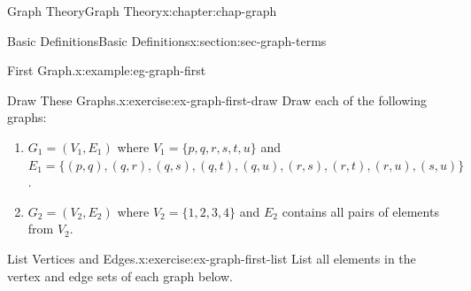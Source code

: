 \documentclass[oneside,10pt,]{book}
\numberwithin{equation}{section}
\begin{document}
\begin{chapterptx}{Graph Theory}{}{Graph Theory}{}{}{x:chapter:chap-graph}
\begin{sectionptx}{Basic Definitions}{}{Basic Definitions}{}{}{x:section:sec-graph-terms}
\begin{example}{First Graph.}{x:example:eg-graph-first}
\begin{sidebyside}{1}{0.375}{0.375}{0}
\begin{sbspanel}{0.25}
{
}%
\end{sbspanel}%
\end{sidebyside}%
\end{example}
\begin{inlineexercise}{Draw These Graphs.}{x:exercise:ex-graph-first-draw}%
Draw each of the following graphs:%
\begin{enumerate}[label=(\alph*)]
\item{}\(G_1 = (V_1, E_1)\) where \(V_1 = \{p, q, r, s, t, u\}\) and \(E_1 = \{(p,q),(q,r),(q,s),(q,t),(q,u),(r,s),(r,t),(r,u),(s,u)\}\).%
\item{}\(G_2 = (V_2, E_2)\) where \(V_2 = \{1,2,3,4\}\) and \(E_2\) contains all pairs of elements from \(V_2\).%
\end{enumerate}
%
\end{inlineexercise}%
\begin{inlineexercise}{List Vertices and Edges.}{x:exercise:ex-graph-first-list}%
List all elements in the vertex and edge sets of each graph below.%
\begin{sidebyside}{2}{0.2}{0.2}{0.06}%
\begin{sbspanel}{0.22}%
\end{sbspanel}
\end{sidebyside}
\end{inlineexercise}
\end{sectionptx}
\end{chapterptx}
\end{document}
